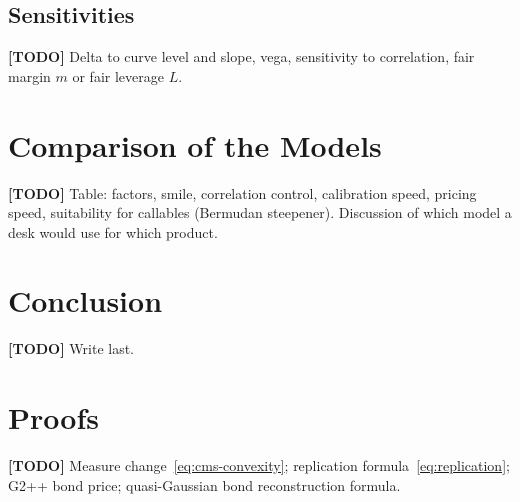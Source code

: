 \documentclass[11pt,a4paper]{article}
\theoremstyle{plain}
\theoremstyle{definition}
\newcommand{\todo}[1]{\textcolor{red!70!black}{\textbf{[TODO]} #1}}
\begin{document}
\subsection{Sensitivities}
\todo{Delta to curve level and slope, vega, sensitivity to correlation, fair margin $m$ or fair leverage $L$.}

\clearpage
\section{Comparison of the Models}
\label{sec:comparison}
\todo{Table: factors, smile, correlation control, calibration speed, pricing speed, suitability for callables (Bermudan steepener). Discussion of which model a desk would use for which product.}

\section{Conclusion}
\label{sec:conclusion}
\todo{Write last.}

\clearpage
\appendix
\section{Proofs}
\label{app:proofs}
\todo{Measure change~\eqref{eq:cms-convexity}; replication formula~\eqref{eq:replication}; G2++ bond price; quasi-Gaussian bond reconstruction formula.}
\end{document}
